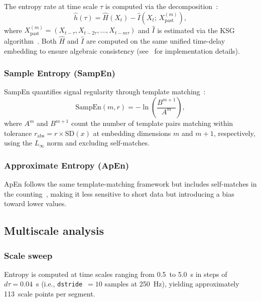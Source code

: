 \documentclass[12pt,a4paper]{article}
\begin{document}
The entropy rate at time scale $\tau$ is computed via the decomposition~\citep{kraskov2004}:
\begin{equation}\label{eq:erate}
  \hat{h}(\tau) = \hat{H}(X_t) - \hat{I}(X_t;\, X_{\text{past}}^{(m)}),
\end{equation}
where $X_{\text{past}}^{(m)} = (X_{t-\tau}, X_{t-2\tau}, \ldots, X_{t-m\tau})$ and $\hat{I}$ is estimated via the KSG algorithm~\citep{kraskov2004}.
Both $\hat{H}$ and $\hat{I}$ are computed on the same unified time-delay embedding to ensure algebraic consistency (see~\citealt{garnier2026} for implementation details).

\subsubsection{Sample Entropy (SampEn)}

SampEn quantifies signal regularity through template matching~\citep{richman2000}:
\begin{equation}\label{eq:sampen}
  \text{SampEn}(m, r) = -\ln\!\left(\frac{B^{m+1}}{A^m}\right),
\end{equation}
where $A^m$ and $B^{m+1}$ count the number of template pairs matching within tolerance $r_{\text{abs}} = r \times \text{SD}(x)$ at embedding dimensions $m$ and $m+1$, respectively, using the $L_\infty$ norm and excluding self-matches.

\subsubsection{Approximate Entropy (ApEn)}

ApEn follows the same template-matching framework but includes self-matches in the counting~\citep{pincus1991}, making it less sensitive to short data but introducing a bias toward lower values.

\subsection{Multiscale analysis}\label{sec:multiscale}

\subsubsection{Scale sweep}

Entropy is computed at time scales ranging from 0.5~to 5.0~s in steps of $d\tau = 0.04$~s (i.e., \texttt{dstride}~$= 10$ samples at 250~Hz), yielding approximately 113~scale points per segment.
\end{document}
